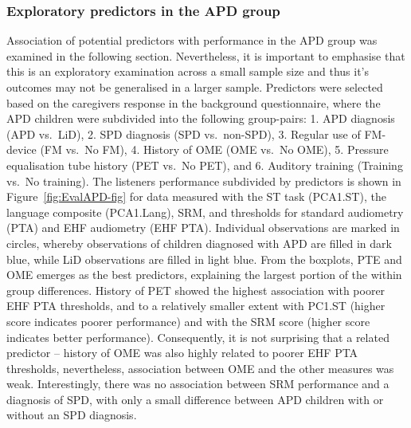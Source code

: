 \documentclass[a4paper, twoside]{templates/ociamthesis}
\begin{document}
\hypertarget{exploratory-predictors-in-the-apd-group}{%
\subsubsection{Exploratory predictors in the APD group}\label{exploratory-predictors-in-the-apd-group}}

Association of potential predictors with performance in the APD group was examined in the following section. Nevertheless, it is important to emphasise that this is an exploratory examination across a small sample size and thus it's outcomes may not be generalised in a larger sample. Predictors were selected based on the caregivers response in the background questionnaire, where the APD children were subdivided into the following group-pairs: 1. APD diagnosis (APD vs.~LiD), 2. SPD diagnosis (SPD vs.~non-SPD), 3. Regular use of FM-device (FM vs.~No FM), 4. History of OME (OME vs.~No OME), 5. Pressure equalisation tube history (PET vs.~No PET), and 6. Auditory training (Training vs.~No training). The listeners performance subdivided by predictors is shown in Figure~\ref{fig:EvalAPD-fig} for data measured with the ST task (PCA1.ST), the language composite (PCA1.Lang), SRM, and thresholds for standard audiometry (PTA) and EHF audiometry (EHF PTA). Individual observations are marked in circles, whereby observations of children diagnosed with APD are filled in dark blue, while LiD observations are filled in light blue. From the boxplots, PTE and OME emerges as the best predictors, explaining the largest portion of the within group differences. History of PET showed the highest association with poorer EHF PTA thresholds, and to a relatively smaller extent with PC1.ST (higher score indicates poorer performance) and with the SRM score (higher score indicates better performance). Consequently, it is not surprising that a related predictor -- history of OME was also highly related to poorer EHF PTA thresholds, nevertheless, association between OME and the other measures was weak. Interestingly, there was no association between SRM performance and a diagnosis of SPD, with only a small difference between APD children with or without an SPD diagnosis.\\
\end{document}
